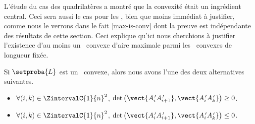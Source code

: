 L'étude du cas des quadrilatères a montré que la convexité était un ingrédient central. Ceci sera aussi le cas pour les \ngones, bien que moins immédiat à justifier, comme nous le verrons dans le fait \ref{max-is-conv} dont la preuve est indépendante des résultats de cette section.
%
Ceci explique qu'ici nous cherchions à justifier l'existence d'au moins un \ngone\ convexe d'aire maximale parmi les \ngones\ convexes de longueur fixée.




\newpage

\begin{fact}
    Si $\setproba{L}$ est un \ncycle\ convexe, alors nous avons l'une des deux alternatives suivantes.
	\begin{itemize}
		\item $\forall (i, k) \in \ZintervalC{1}{n}^2$,
		$\det \big( \vect{A^{\,\prime}_i A^{\,\prime}_{i+1}}, \vect{A^{\,\prime}_i A^{\,\prime}_k} \big) \geq 0$.

		\item $\forall (i, k) \in \ZintervalC{1}{n}^2$,
		$\det \big( \vect{A^{\,\prime}_i A^{\,\prime}_{i+1}}, \vect{A^{\,\prime}_i A^{\,\prime}_k} \big) \leq 0$.
    \end{itemize}
\end{fact}


